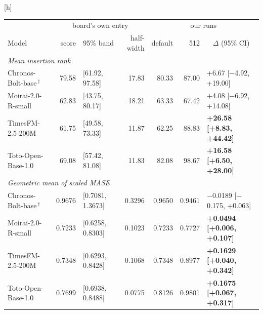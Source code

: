 \documentclass{article}
\makeatletter
\renewenvironment{table}
  {\setlength{\abovecaptionskip}{6\p@}%
   \setlength{\belowcaptionskip}{\z@}%
   \@float{table}}
  {\end@float}
\makeatother
\begin{document}
\begin{table}[h]
\centering
\scriptsize
\setlength{\tabcolsep}{3pt}
\begin{tabular}{lrlrrrl}
\toprule
 & \multicolumn{3}{c}{board's own entry} & \multicolumn{3}{c}{our runs} \\
\cmidrule(lr){2-4}\cmidrule(lr){5-7}
Model & score & \multicolumn{1}{c}{95\% band} & half-width & default & 512 & \multicolumn{1}{c}{$\Delta$ (95\% CI)} \\
\midrule
\multicolumn{7}{l}{\emph{Mean insertion rank}} \\
Chronos-Bolt-base\,$^\dagger$ & 79.58 & [61.92, 97.58] & 17.83 & 80.33 & 87.00 & +6.67 [$-$4.92, +19.00] \\
Moirai-2.0-R-small & 62.83 & [43.75, 80.17] & 18.21 & 63.33 & 67.42 & +4.08 [$-$6.92, +14.08] \\
TimesFM-2.5-200M & 61.75 & [49.58, 73.33] & 11.87 & 62.25 & 88.83 & \textbf{+26.58 [+8.83, +44.42]} \\
Toto-Open-Base-1.0 & 69.08 & [57.42, 81.08] & 11.83 & 82.08 & 98.67 & \textbf{+16.58 [+6.50, +28.00]} \\
\midrule
\multicolumn{7}{l}{\emph{Geometric mean of scaled MASE}} \\
Chronos-Bolt-base\,$^\dagger$ & 0.9676 & [0.7081, 1.3673] & 0.3296 & 0.9650 & 0.9461 & $-$0.0189 [$-$0.175, +0.063] \\
Moirai-2.0-R-small & 0.7233 & [0.6258, 0.8303] & 0.1023 & 0.7233 & 0.7727 & \textbf{+0.0494 [+0.006, +0.107]} \\
TimesFM-2.5-200M & 0.7348 & [0.6293, 0.8428] & 0.1068 & 0.7348 & 0.8977 & \textbf{+0.1629 [+0.040, +0.342]} \\
Toto-Open-Base-1.0 & 0.7699 & [0.6938, 0.8488] & 0.0775 & 0.8126 & 0.9801 & \textbf{+0.1675 [+0.067, +0.317]} \\
\bottomrule
\end{tabular}
\caption{The submitted version's runs on the 12 configurations, kept as a record and superseded by Table~\ref{tab:g1}. Mean insertion rank is the mean rank on MASE of a run entered into the board's pool as an extra entry. The board columns hold each entry's published score and the 95\% band from resampling configurations, with no runs of ours. Default is the documented history length. A positive $\Delta$ is worse. Bold marked a percentile-bootstrap interval excluding zero, a rule this version withdraws (Appendix~\ref{app:changes}). Toto's default column is the run that scored one point forecast. The dagger marks the leakage-flagged entry.}
\label{tab:grid}
\end{table}
\end{document}
